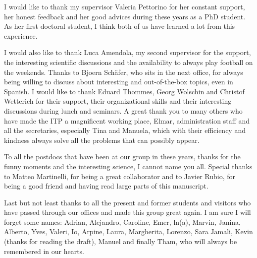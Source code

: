 \documentclass[
11pt, %
german, english,%
singlespacing, %
headsepline, %
]{MastersDoctoralThesis} %
\begin{document}

\begin{acknowledgements}

I would like to thank my supervisor Valeria Pettorino for her constant support, her honest feedback and her good advices during these years as a PhD student.
As her first doctoral student, I think both of us have learned a lot from this experience.

I would also like to thank Luca Amendola, my second supervisor for the support, the interesting scientific discussions and the availability to always play football on the weekends.
Thanks to Bjoern Schäfer, who sits in the next office, for always being willing to discuss about interesting and out-of-the-box topics, even in Spanish.
I would like to thank Eduard Thommes, Georg Wolschin and Christof Wetterich for their support, their organizational skills and their interesting discussions during lunch and seminars.
A great thank you to many others who have made the ITP a magnificent working place, Elmar, administration staff and all the secretaries, especially Tina and Manuela, which with their efficiency and kindness always solve all the problems that can possibly appear.

To all the postdocs that have been at our group in these years, thanks for the funny moments and the interesting science, I cannot name you all. Special thanks to Matteo Martinelli, for being a great collaborator and to Javier Rubio, for being a good friend and having read large parts of this manuscript.

Last but not least thanks to all the present and former students and visitors who have passed through our offices and made this group great again. I am sure I will forget some names: Adrian, Alejandro, Caroline, Emer, ln(a), Marvin, Janina, Alberto, Yves, Valeri, Io, Arpine, Laura, Margherita, Lorenzo, Sara Jamali, 
Kevin (thanks for reading the draft), Manuel and finally Tham, who will always be remembered in our hearts. 


\end{acknowledgements}
\end{document}
